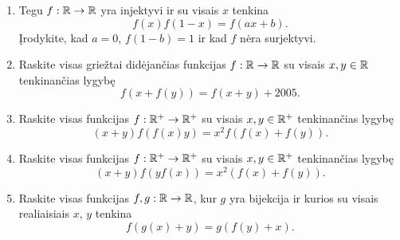\begin{enumerate}
  \item Tegu $f:\mathbb R \to \mathbb R$ yra injektyvi ir su visais $x$ tenkina
    $$f(x)f(1-x)=f(ax+b).$$ Įrodykite, kad $a=0$, $f(1-b)=1$ ir kad $f$
    nėra surjektyvi.
  \item Raskite visas griežtai didėjančias funkcijas $f:\mathbb R\to\mathbb R$ su visais
    $x,y \in \mathbb R$ tenkinančias lygybę $$f(x+f(y))=f(x+y)+2005.$$
  \item Raskite visas funkcijas $f:\mathbb R^+\to\mathbb R^+$ su visais $x, y \in \mathbb R^+$
    tenkinančias lygybę $$(x+y)f(f(x)y)=x^2f(f(x)+f(y)).$$
  \item Raskite visas funkcijas $f:\mathbb R^+\to\mathbb R^+$ su visais $x, y \in \mathbb R^+$
    tenkinančias lygybę $$(x+y)f(yf(x))=x^2(f(x)+f(y)).$$
  \item Raskite visas funkcijas $f,g:\mathbb R\to\mathbb R$, kur $g$ yra bijekcija ir
    kurios su visais realiaisiais $x$, $y$ tenkina $$f(g(x)+y)=g(f(y)+x).$$

\end{enumerate}
